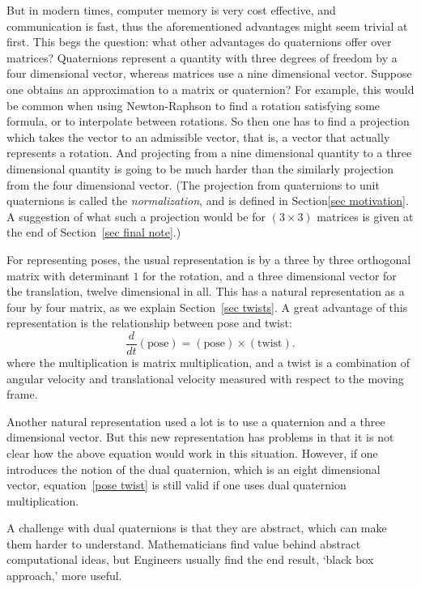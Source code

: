 \documentclass[reqno,12pt]{amsart}
\begin{document}
But in modern times, computer memory is very cost effective, and communication is fast, thus the aforementioned advantages might seem trivial at first.  This begs the question: what other advantages do quaternions offer over matrices?  Quaternions represent a quantity with three degrees of freedom by a four dimensional vector, whereas matrices use a nine dimensional vector.  Suppose one obtains an approximation to a matrix or quaternion?  For example, this would be common when using Newton-Raphson to find a rotation satisfying some formula, or to interpolate between rotations.  So then one has to find a projection which takes the vector to an admissible vector, that is, a vector that actually represents a rotation.  And projecting from a nine dimensional quantity to a three dimensional quantity is going to be much harder than the similarly projection from the four dimensional vector.  (The projection from quaternions to unit quaternions is called the \emph{normalization}, and is defined in Section\ref{sec motivation}.  A suggestion of what such a projection would be for $(3 \times 3)$ matrices is given at the end of Section~\ref{sec final note}.)

For representing poses, the usual representation is by a three by three orthogonal matrix with determinant $1$ for the rotation, and a three dimensional vector for the translation, twelve dimensional in all.  This has a natural representation as a four by four matrix, as we explain Section~\ref{sec twists}.  A great advantage of this representation is the relationship between pose and twist:
\begin{equation}
\label{pose twist}
\frac d{dt} (\text{pose}) = (\text{pose}) \times (\text{twist}).
\end{equation}
where the multiplication is matrix multiplication, and a twist is a combination of angular velocity and translational velocity measured with respect to the moving frame.

Another natural representation used a lot is to use a quaternion and a three dimensional vector.  But this new representation has problems in that it is not clear how the above equation would work in this situation.  However, if one introduces the notion of the dual quaternion, which is an eight dimensional vector, equation~\eqref{pose twist} is still valid if one uses dual quaternion multiplication.

A challenge with dual quaternions is that they are abstract, which can make them harder to understand.  Mathematicians find value behind abstract computational ideas, but Engineers usually find the end result, `black box approach,' more useful.
\end{document}
